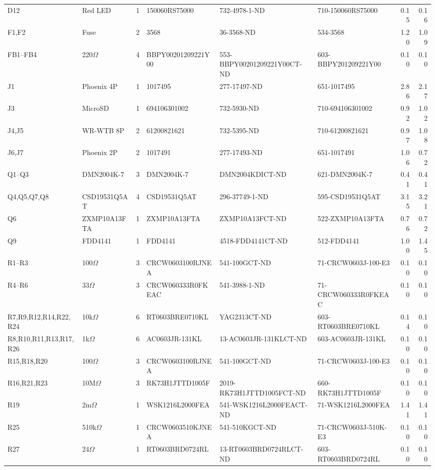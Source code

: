 {\begin{longtable}{@{}llrlp{2.8cm}p{2.5cm}rr@{}}
D12 & Red LED & 1 & 150060RS75000 & 732-4978-1-ND & 710-150060RS75000 & 0.15 & 0.16 \\
F1,F2 & Fuse & 2 & 3568 & 36-3568-ND & 534-3568 & 1.20 & 1.09 \\
FB1--FB4 & 220$\Omega$ & 4 & BBPY00201209221Y00 & 553-BBPY00201209221Y00CT-ND & 603-BBPY201209221Y00 & 0.10 & 0.10 \\
J1 & Phoenix 4P & 1 & 1017495 & 277-17497-ND & 651-1017495 & 2.86 & 2.17 \\
J3 & MicroSD & 1 & 694106301002 & 732-5930-ND & 710-694106301002 & 0.92 & 1.02 \\
J4,J5 & WR-WTB 8P & 2 & 61200821621 & 732-5395-ND & 710-61200821621 & 0.97 & 1.08 \\
J6,J7 & Phoenix 2P & 2 & 1017491 & 277-17493-ND & 651-1017491 & 1.06 & 0.72 \\
Q1--Q3 & DMN2004K-7 & 3 & DMN2004K-7 & DMN2004KDICT-ND & 621-DMN2004K-7 & 0.41 & 0.41 \\
Q4,Q5,Q7,Q8 & CSD19531Q5AT & 4 & CSD19531Q5AT & 296-37749-1-ND & 595-CSD19531Q5AT & 3.15 & 3.21 \\
Q6 & ZXMP10A13FTA & 1 & ZXMP10A13FTA & ZXMP10A13FCT-ND & 522-ZXMP10A13FTA & 0.76 & 0.72 \\
Q9 & FDD4141 & 1 & FDD4141 & 4518-FDD4141CT-ND & 512-FDD4141 & 1.00 & 1.45 \\
R1--R3 & 100$\Omega$ & 3 & CRCW0603100RJNEA & 541-100GCT-ND & 71-CRCW0603J-100-E3 & 0.10 & 0.10 \\
R4--R6 & 33$\Omega$ & 3 & CRCW060333R0FKEAC & 541-3988-1-ND & 71-CRCW060333R0FKEAC & 0.10 & 0.10 \\
R7,R9,R12,R14,R22,R24 & 10k$\Omega$ & 6 & RT0603BRE0710KL & YAG2313CT-ND & 603-RT0603BRE0710KL & 0.14 & 0.10 \\
R8,R10,R11,R13,R17,R26 & 1k$\Omega$ & 6 & AC0603JR-131KL & 13-AC0603JR-131KLCT-ND & 603-AC0603JR-131KL & 0.10 & 0.10 \\
R15,R18,R20 & 100$\Omega$ & 3 & CRCW0603100RJNEA & 541-100GCT-ND & 71-CRCW0603J-100-E3 & 0.10 & 0.10 \\
R16,R21,R23 & 10M$\Omega$ & 3 & RK73H1JTTD1005F & 2019-RK73H1JTTD1005FCT-ND & 660-RK73H1JTTD1005F & 0.10 & 0.10 \\
R19 & 2m$\Omega$ & 1 & WSK1216L2000FEA & 541-WSK1216L2000FEACT-ND & 71-WSK1216L2000FEA & 1.41 & 1.41 \\
R25 & 510k$\Omega$ & 1 & CRCW0603510KJNEA & 541-510KGCT-ND & 71-CRCW0603J-510K-E3 & 0.10 & 0.10 \\
R27 & 24$\Omega$ & 1 & RT0603BRD0724RL & 13-RT0603BRD0724RLCT-ND & 603-RT0603BRD0724RL & 0.10 & 0.10 \\

\end{longtable}}

